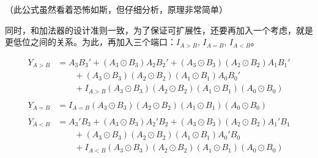 \documentclass[UTF8]{ctexart}
\begin{document}
（此公式虽然看着恐怖如斯，但仔细分析，原理非常简单）

同时，和加法器的设计准则一致，为了保证可扩展性，还要再加入一个考虑，就是更低位之间的关系。为此，再加入三个端口：$I_{A>B},\,I_{A=B},\,I_{A<B}$。

\[\begin{aligned} Y_{A>B}&=A_3B_3'+(A_3\odot B_3)A_2B_2'+(A_3\odot B_3)(A_2\odot B_2)A_1B_1'\\ &\qquad+(A_3\odot B_3)(A_2\odot B_2)(A_1\odot B_1)A_0B_0'\\ &\qquad+I_{A>B}(A_3\odot B_3)(A_2\odot B_2)(A_1\odot B_1)(A_0\odot B_0)\\\\ Y_{A=B}&=I_{A=B}(A_3\odot B_3)(A_2\odot B_2)(A_1\odot B_1)(A_0\odot B_0)\\\\ Y_{A<B}&=A_3'B_3+(A_3\odot B_3)A_2'B_2+(A_3\odot B_3)(A_2\odot B_2)A_1'B_1\\ &\qquad+(A_3\odot B_3)(A_2\odot B_2)(A_1\odot B_1)A_0'B_0\\ &\qquad+I_{A<B}(A_3\odot B_3)(A_2\odot B_2)(A_1\odot B_1)(A_0\odot B_0)\\  \end{aligned}\]
\end{document}

